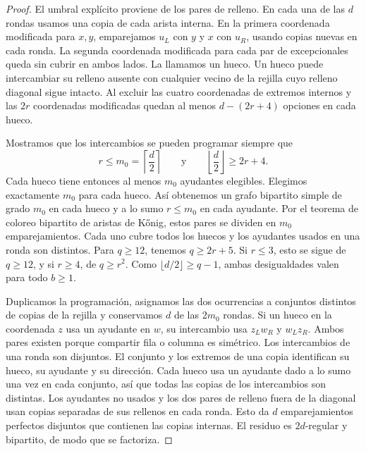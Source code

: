 \begin{proof}
El umbral explícito proviene de los pares de relleno. En cada una de las \(d\) rondas usamos una copia de cada arista interna. En la primera coordenada modificada para \(x,y\), emparejamos \(u_L\) con \(y\) y \(x\) con \(u_R\), usando copias nuevas en cada ronda. La segunda coordenada modificada para cada par de excepcionales queda sin cubrir en ambos lados. La llamamos un hueco. Un hueco puede intercambiar su relleno ausente con cualquier vecino de la rejilla cuyo relleno diagonal sigue intacto. Al excluir las cuatro coordenadas de extremos internos y las \(2r\) coordenadas modificadas quedan al menos \(d-(2r+4)\) opciones en cada hueco.

Mostramos que los intercambios se pueden programar siempre que
\[
 r\le m_0=\left\lceil\frac d2\right\rceil
 \qquad\text{y}\qquad
 \left\lfloor\frac d2\right\rfloor\ge 2r+4.
\]
Cada hueco tiene entonces al menos \(m_0\) ayudantes elegibles. Elegimos exactamente \(m_0\) para cada hueco. Así obtenemos un grafo bipartito simple de grado \(m_0\) en cada hueco y a lo sumo \(r\le m_0\) en cada ayudante. Por el teorema de coloreo bipartito de aristas de K\H{o}nig, estos pares se dividen en \(m_0\) emparejamientos. Cada uno cubre todos los huecos y los ayudantes usados en una ronda son distintos. Para \(q\ge12\), tenemos \(q\ge2r+5\). Si \(r\le3\), esto se sigue de \(q\ge12\), y si \(r\ge4\), de \(q\ge r^2\). Como \(\lfloor d/2\rfloor\ge q-1\), ambas desigualdades valen para todo \(b\ge1\).

Duplicamos la programación, asignamos las dos ocurrencias a conjuntos distintos de copias de la rejilla y conservamos \(d\) de las \(2m_0\) rondas. Si un hueco en la coordenada \(z\) usa un ayudante en \(w\), su intercambio usa \(z_Lw_R\) y \(w_Lz_R\). Ambos pares existen porque compartir fila o columna es simétrico. Los intercambios de una ronda son disjuntos. El conjunto y los extremos de una copia identifican su hueco, su ayudante y su dirección. Cada hueco usa un ayudante dado a lo sumo una vez en cada conjunto, así que todas las copias de los intercambios son distintas. Los ayudantes no usados y los dos pares de relleno fuera de la diagonal usan copias separadas de sus rellenos en cada ronda. Esto da \(d\) emparejamientos perfectos disjuntos que contienen las copias internas. El residuo es \(2d\)-regular y bipartito, de modo que se factoriza.


\end{proof}
